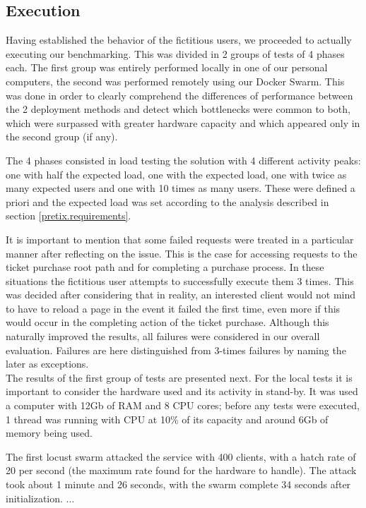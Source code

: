 \documentclass[12pt]{article}
\begin{document}
\subsection{Execution} \label{performance.execution} %


Having established the behavior of the fictitious users, we proceeded to actually executing our benchmarking.
This was divided in 2 groups of tests of 4 phases each.
The first group was entirely performed locally in one of our personal computers, the second was performed remotely using our Docker Swarm.
This was done in order to clearly comprehend the differences of performance between the 2 deployment methods and detect which bottlenecks were common to both, 
which were surpassed with greater hardware capacity and which appeared only in the second group (if any).

The 4 phases consisted in load testing the solution with 4 different activity peaks: one with half the expected load, one with the expected load, one with 
twice as many expected users and one with 10 times as many users.
These were defined a priori and the expected load was set according to the analysis described in section \ref{pretix.requirements}. 

It is important to mention that some failed requests were treated in a particular manner after reflecting on the issue.
This is the case for accessing requests to the ticket purchase root path and for completing a purchase process.
In these situations the fictitious user attempts to successfully execute them 3 times.
This was decided after considering that in reality, an interested client would not mind to have to reload a page in the event it failed the first time, even more 
if this would occur in the completing action of the ticket purchase.
Although this naturally improved the results, all failures were considered in our overall evaluation.
Failures are here distinguished from 3-times failures by naming the later as exceptions. \\

The results of the first group of tests are presented next.
For the local tests it is important to consider the hardware used and its activity in stand-by.
It was used a computer with 12Gb of RAM and 8 CPU cores; before any tests were executed, 1 thread was running with CPU at 10\% of its capacity and around 6Gb 
of memory being used.

The first locust swarm attacked the service with 400 clients, with a hatch rate of 20 per second (the maximum rate found for the hardware to handle).
The attack took about 1 minute and 26 seconds, with the swarm complete 34 seconds after initialization.
... \\
\end{document}
